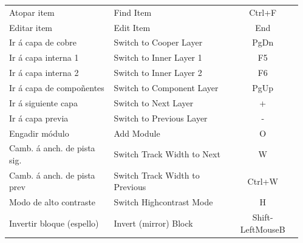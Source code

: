 \documentclass[20pt]{tikzposter} %
\begin{document}
\begin{columns}
{\begin{tabular}{l|l|c}
    Atopar item & Find Item & Ctrl+F\\
    Editar item & Edit Item & End\\
    Ir á capa de cobre & Switch to Cooper Layer & PgDn\\
    Ir á capa interna 1 & Switch to Inner Layer 1 & F5\\
    Ir á capa interna 2 & Switch to Inner Layer 2 & F6\\
    Ir á capa de compoñentes & Switch to Component Layer & PgUp\\
    Ir á siguiente capa & Switch to Next Layer & +\\
    Ir á capa previa & Switch to Previous Layer & -\\
    Engadir módulo & Add Module & O\\
    Camb. á anch. de pista sig. & Switch Track Width to Next & W\\
    Camb. á anch. de pista prev & Switch Track Width to Previous & Ctrl+W\\
    Modo de alto contraste & Switch Highcontrast Mode & H\\
    Invertir bloque (espello) & Invert (mirror) Block & Shift-LeftMouseB\\
  \end{tabular}
}



\begin{subcolumns}
      
     
      
\end{subcolumns}

\end{columns}
\end{document}

